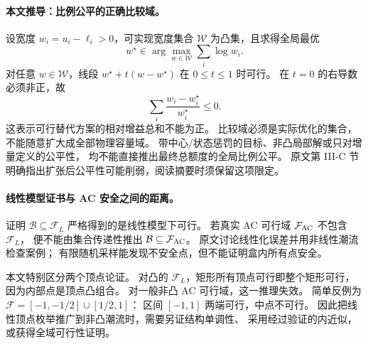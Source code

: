 \documentclass[UTF8,11pt,fontset=fandol]{ctexart}
\theoremstyle{remark}
\numberwithin{equation}{section}
\begin{document}
\paragraph{本文推导：比例公平的正确比较域。}
设宽度 $w_i=u_i-\ell_i>0$，可实现宽度集合 $\mathcal W$ 为凸集，且求得全局最优
\begin{equation}
 w^\star\in\arg\max_{w\in\mathcal W}\sum_i\log w_i.
 \label{eq:eng-s11-logfair}
\end{equation}
对任意 $w\in\mathcal W$，线段 $w^\star+t(w-w^\star)$ 在 $0\leq t\leq1$ 时可行。
在 $t=0$ 的右导数必须非正，故
\begin{equation}
 \sum_i\frac{w_i-w_i^\star}{w_i^\star}\leq0.
 \label{eq:eng-s11-propfair}
\end{equation}
这表示可行替代方案的相对增益总和不能为正。
比较域必须是实际优化的集合，不能随意扩大成全部物理容量域。
带中心/状态惩罚的目标、非凸局部解或只对增量定义的公平性，
均不能直接推出最终总额度的全局比例公平。
原文第 III-C 节明确指出扩张后公平性可能削弱，阅读摘要时须保留这项限定。

\paragraph{线性模型证书与 AC 安全之间的距离。}
证明 $\mathcal B\subseteq\mathcal F_L$ 严格得到的是线性模型下可行。
若真实 AC 可行域 $\mathcal F_{\rm AC}$ 不包含 $\mathcal F_L$，
便不能由集合传递性推出 $\mathcal B\subseteq\mathcal F_{\rm AC}$。
原文讨论线性化误差并用非线性潮流检查案例；
有限随机采样能发现不安全点，但不能证明盒内所有点安全。

本文特别区分两个顶点论证。
对凸的 $\mathcal F_L$，矩形所有顶点可行即整个矩形可行，因为内部点是顶点凸组合。
对一般非凸 AC 可行域，这一推理失效。
简单反例为 $\mathcal F=[-1,-1/2]\cup[1/2,1]$：
区间 $[-1,1]$ 两端可行，中点不可行。
因此把线性顶点枚举推广到非凸潮流时，需要另证结构单调性、
采用经过验证的内近似，或获得全域可行性证明。
\end{document}

